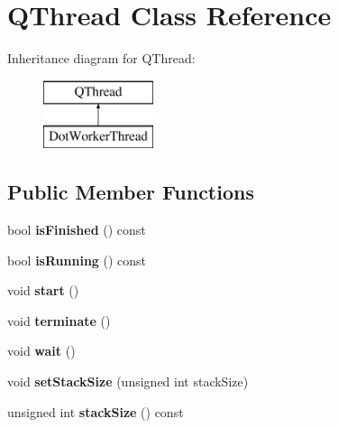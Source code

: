 \hypertarget{class_q_thread}{}\section{Q\+Thread Class Reference}
\label{class_q_thread}
Inheritance diagram for Q\+Thread\+:\begin{figure}[H]
\begin{center}
\leavevmode
\includegraphics[height=2.000000cm]{class_q_thread}
\end{center}
\end{figure}
\subsection*{Public Member Functions}
\begin{DoxyCompactItemize}
\item 
\mbox{\label{class_q_thread_a5fd1a57f7e1543b66d30766dddaedacd}} 
bool {\bfseries is\+Finished} () const
\item 
\mbox{\label{class_q_thread_a3d532144308fd61896be0a5b5cb7a454}} 
bool {\bfseries is\+Running} () const
\item 
\mbox{\label{class_q_thread_a46863abb95653dd33acee1aaa77c35ed}} 
void {\bfseries start} ()
\item 
\mbox{\label{class_q_thread_a0a1310a5a228d6a4fa37484eef5769a5}} 
void {\bfseries terminate} ()
\item 
\mbox{\label{class_q_thread_a113d1bab9ba1efba261153a9d71ca72c}} 
void {\bfseries wait} ()
\item 
\mbox{\label{class_q_thread_ad715dad9f5dd026de4a518affada1aea}} 
void {\bfseries set\+Stack\+Size} (unsigned int stack\+Size)
\item 
\mbox{\label{class_q_thread_aef9d69470b9cbfbd0c6019ab7840c847}} 
unsigned int {\bfseries stack\+Size} () const
\end{DoxyCompactItemize}
